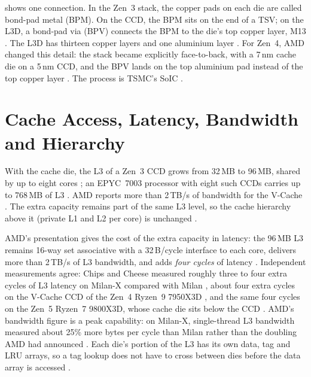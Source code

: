  shows one connection. In the Zen~3 stack, the copper pads on each die are called bond-pad metal (BPM). On the CCD, the BPM sits on the end of a TSV; on the L3D, a bond-pad via (BPV) connects the BPM to the die's top copper layer, M13 \cite[slide~16]{wuu2022vcache}. The L3D has thirteen copper layers and one aluminium layer \cite[slide~11]{wuu2022vcache}. For Zen~4, AMD changed this detail: the stack became explicitly face-to-back, with a 7\,nm cache die on a 5\,nm CCD, and the BPV lands on the top aluminium pad instead of the top copper layer \cite[slides~11--12]{alam2ndGeneration3D2024}. The process is TSMC's SoIC \cite[slide~16]{wuu2022vcache}.



\section{Cache Access, Latency, Bandwidth and Hierarchy}
\label{sec:vcache-access}

With the cache die, the L3 of a Zen~3 CCD grows from 32\,MB to 96\,MB, shared by up to eight cores \cite{wuu2022vcache,amd2022epyc7003}; an EPYC~7003 processor with eight such CCDs carries up to 768\,MB of L3 \cite{amd2022epyc7003}. AMD reports more than 2\,TB/s of bandwidth for the V-Cache \cite{wuu2022vcache}. The extra capacity remains part of the same L3 level, so the cache hierarchy above it (private L1 and L2 per core) is unchanged \cite{amd2022epyc7003}.

AMD's presentation gives the cost of the extra capacity in latency: the 96\,MB L3 remains 16-way set associative with a 32\,B/cycle interface to each core, delivers more than 2\,TB/s of L3 bandwidth, and adds \emph{four cycles} of latency \cite[slide~20]{wuu2022vcache}. Independent measurements agree: Chips and Cheese measured roughly three to four extra cycles of L3 latency on Milan-X compared with Milan \cite{cozmaDeepDivingZen2022}, about four extra cycles on the V-Cache CCD of the Zen~4 Ryzen~9 7950X3D \cite{lamAMDs7950X3DZen2023}, and the same four cycles on the Zen~5 Ryzen~7 9800X3D, whose cache die sits below the CCD \cite{cozmaAMDs9800X3D2nd2024}. AMD's bandwidth figure is a peak capability: on Milan-X, single-thread L3 bandwidth measured about 25\% more bytes per cycle than Milan rather than the doubling AMD had announced \cite{cozmaDeepDivingZen2022}. Each die's portion of the L3 has its own data, tag and LRU arrays, so a tag lookup does not have to cross between dies before the data array is accessed \cite[slide~20]{wuu2022vcache}.

